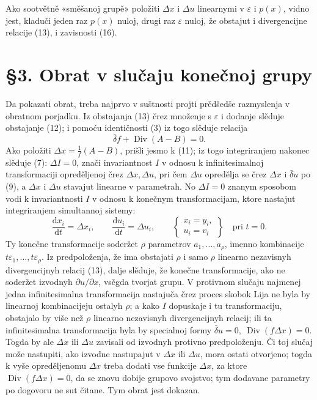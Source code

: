 \documentclass[11pt]{article}
\providecommand{\eps}{\varepsilon}
\providecommand{\D}{\Delta}
\providecommand{\p}{\partial}
\providecommand{\dd}{\mathrm d}
\DeclareMathOperator{\Div}{Div}
\providecommand{\bd}{\bar{\delta}}
\begin{document}
Ako sootvětně «směšanoj grupě» položiti \(\D x\) i \(\D u\) linearnymi v \(\eps\) i \(p(x)\), vidno jest, kladuči jeden raz \(p(x)\) nuloj, drugi raz \(\eps\) nuloj, že obstajut i divergencijne relacije (13), i zavisnosti (16).

\section*{\S{}3. Obrat v slučaju konečnoj grupy}

Da pokazati obrat, treba najprvo v suštnosti projti prědšedše razmyslenja v obratnom porjadku. Iz obstajanja (13) črez množenje s \(\eps\) i dodanje slěduje obstajanje (12); i pomoću identičnosti (3) iz togo slěduje relacija
\[
\bd f+\Div(A-B)=0.
\]
Ako položiti \(\D x=\frac{1}{f}(A-B)\), prišli jesmo k (11); iz togo integriranjem nakonec slěduje (7): \(\D I=0\), znači invariantnost \(I\) v odnosu k infinitesimalnoj transformaciji opreděljenoj črez \(\D x,\D u\), pri čem \(\D u\) opredělja se črez \(\D x\) i \(\bd u\) po (9), a \(\D x\) i \(\D u\) stavajut linearne v parametrah. No \(\D I=0\) znanym sposobom vodi k invariantnosti \(I\) v odnosu k konečnym transformacijam, ktore nastajut integriranjem simultannoj sistemy:
\begin{equation}
\frac{\dd x_i}{\dd t}=\D x_i,\qquad
\frac{\dd u_i}{\dd t}=\D u_i,\qquad
\left\{\begin{array}{l}
x_i=y_i,\\
u_i=v_i
\end{array}\right\}
\quad\text{pri }t=0.
\tag{17}
\end{equation}
Ty konečne transformacije soderžet \(\rho\) parametrov \(a_1,\ldots,a_\rho\), imenno kombinacije \(t\eps_1,\ldots,t\eps_\rho\). Iz predpoloženja, že ima obstajati \(\rho\) i samo \(\rho\) linearno nezavisnyh divergencijnyh relacij (13), dalje slěduje, že konečne transformacije, ako ne soderžet izvodnyh \(\p u/\p x\), vsěgda tvorjat grupu. V protivnom slučaju najmenej jedna infinitesimalna transformacija nastajuča črez proces skobok Lija ne byla by linearnoj kombinacijeju ostalyh \(\rho\); a kako \(I\) dopuskaje i tu transformaciju, obstajalo by više než \(\rho\) linearno nezavisnyh divergencijnyh relacij; ili ta infinitesimalna transformacija byla by specialnoj formy \(\bd u=0,\ \Div(f\D x)=0\). Togda by ale \(\D x\) ili \(\D u\) zavisali od izvodnyh protivno predpoloženju. Či toj slučaj može nastupiti, ako izvodne nastupajut v \(\D x\) ili \(\D u\), mora ostati otvorjeno; togda k vyše opreděljenomu \(\D x\) treba dodati vse funkcije \(\D x\), za ktore \(\Div(f\D x)=0\), da se znovu dobije grupovo svojstvo; tym dodavane parametry po dogovoru ne sut čitane. Tym obrat jest dokazan.
\end{document}
